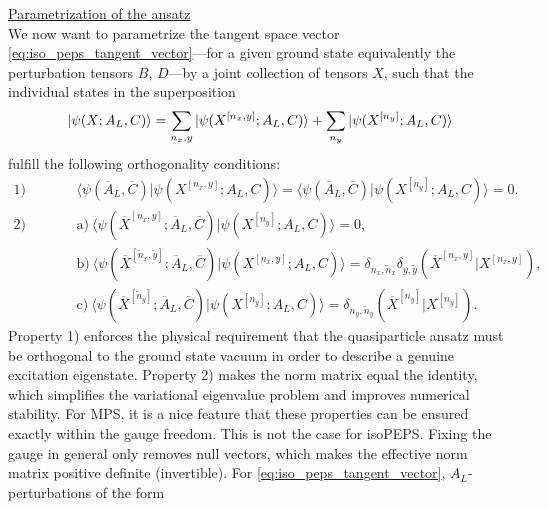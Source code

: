 \noindent \underline{Parametrization of the ansatz} \\[0.5em]
We now want to parametrize the tangent space vector \eqref{eq:iso_peps_tangent_vector}---for a given ground state equivalently the perturbation tensors $B$, $D$---by a joint collection of tensors $X$, such that the individual states in the superposition
\begin{equation}
	\ket{\psi(X; A_L, C)} = \sum_{n_x, y} \ket{\psi(X^{[n_x, y]}; A_L, C)} + \sum_{n_y} \ket{\psi(X^{[n_y]}; A_L, C)}
\end{equation}
fulfill the following orthogonality conditions:
\begin{equation} \label{eq:e_iso_peps_properties}
	\begin{array}{ll}
	\text{1) Ground state} 
	&\langle \psi( \overline{A}_L, \overline{C}) \vert \psi(X^{[n_x, y]}; A_L, C) \rangle
	= \langle \psi( \overline{A}_L, \overline{C}) \vert \psi(X^{[n_y]}; A_L, C) \rangle
	= 0. \\[0.5em]
	\text{2) Pairwise}
	& \text{a)}\: \langle \psi(\overline{X}^{[n_x, y]};  \overline{A}_L, \overline{C}) \vert \psi(X^{[n_y]}; A_L, C) \rangle = 0, \\[0.3em]
	& \text{b)}\:\langle \psi(\overline{X}^{[\tilde{n}_x, \tilde{y}]};  \overline{A}_L, \overline{C}) \vert \psi(X^{[n_x, y]}; A_L, C) \rangle = \delta_{n_x, \tilde{n}_x} \delta_{y, \tilde{y}}(\overline{X}^{[n_x, y]} \vert X^{[n_x, y]}), \\[0.3em]
	& \text{c)}\: \langle \psi(\overline{X}^{[\tilde{n}_y]};  \overline{A}_L, \overline{C}) \vert \psi(X^{[n_y]}; A_L, C) \rangle = \delta_{n_y, \tilde{n}_y} (\overline{X}^{[n_y]} \vert X^{[n_y]}).
	\end{array}
\end{equation}
Property 1) enforces the physical requirement that the quasiparticle ansatz must be orthogonal to the ground state vacuum in order to describe a genuine excitation eigenstate. Property 2) makes the norm matrix equal the identity, which simplifies the variational eigenvalue problem and improves numerical stability. For MPS, it is a nice feature that these properties can be ensured exactly within the gauge freedom. This is not the case for isoPEPS. Fixing the gauge in general only removes null vectors, which makes the effective norm matrix positive definite (invertible). For \eqref{eq:iso_peps_tangent_vector}, $A_L$-perturbations of the form
